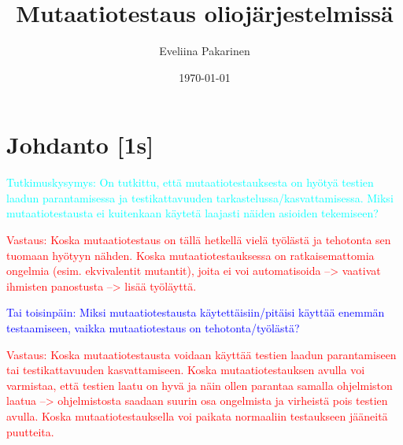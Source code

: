 \documentclass[finnish, grading]{tktltiki2}
\title{Mutaatiotestaus oliojärjestelmissä}
\author{Eveliina Pakarinen}
\date{\today}
\theoremstyle{definition}
\theoremstyle{remark}
\begin{document}

\frontmatter      %

\maketitle        %
\makeabstract     %

\tableofcontents  %


\mainmatter       %




\section{Johdanto [1s]}

\textcolor{cyan}{Tutkimuskysymys: On tutkittu, että mutaatiotestauksesta on hyötyä testien laadun parantamisessa ja testikattavuuden tarkastelussa/kasvattamisessa. Miksi mutaatiotestausta ei kuitenkaan käytetä laajasti näiden asioiden tekemiseen?}

\textcolor{red}{Vastaus: Koska mutaatiotestaus on tällä hetkellä vielä työlästä ja tehotonta sen tuomaan hyötyyn nähden. Koska mutaatiotestauksessa on ratkaisemattomia ongelmia (esim. ekvivalentit mutantit), joita ei voi automatisoida --> vaativat ihmisten panostusta --> lisää työläyttä.} 

\textcolor{blue}{Tai toisinpäin: Miksi mutaatiotestausta käytettäisiin/pitäisi käyttää enemmän testaamiseen, vaikka mutaatiotestaus on tehotonta/työlästä?}

\textcolor{red}{Vastaus: Koska mutaatiotestausta voidaan käyttää testien laadun parantamiseen tai testikattavuuden kasvattamiseen. Koska mutaatiotestauksen avulla voi varmistaa, että testien laatu on hyvä ja näin ollen parantaa samalla ohjelmiston laatua --> ohjelmistosta saadaan suurin osa ongelmista ja virheistä pois testien avulla. Koska mutaatiotestauksella voi paikata normaaliin testaukseen jääneitä puutteita.} 
\end{document}
